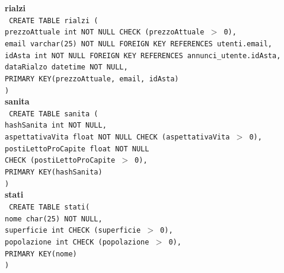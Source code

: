 \documentclass[a4paper,12pt]{report}
\begin{document}
                \newpage
                \noindent
                {\large \textbf{rialzi}} \\
                \texttt{
                    CREATE TABLE rialzi ( \\
                    \null\quad\quad prezzoAttuale   int         NOT NULL CHECK (prezzoAttuale $>$ 0), \\
                    \null\quad\quad email          varchar(25)     NOT NULL FOREIGN KEY REFERENCES utenti.email, \\
                    \null\quad\quad idAsta      int         NOT NULL FOREIGN KEY REFERENCES annunci\_utente.idAsta, \\
                    \null\quad\quad dataRialzo      datetime    NOT NULL, \\
                    \null\quad\quad PRIMARY KEY(prezzoAttuale, email, idAsta) \\
                    )
                } \\

                \noindent
                {\large \textbf{sanita}} \\
                \texttt{
                    CREATE TABLE sanita ( \\
                    \null\quad\quad hashSanita int NOT NULL, \\
                    \null\quad\quad aspettativaVita     float   NOT NULL CHECK (aspettativaVita $>$ 0), \\
                    \null\quad\quad postiLettoProCapite   float   NOT NULL \\
                            \null\qquad\qquad CHECK (postiLettoProCapite $>$ 0), \\
                    \null\quad\quad PRIMARY KEY(hashSanita) \\
                    )
                } \\

                \noindent
                {\large \textbf{stati}} \\
                \texttt{
                    CREATE TABLE stati( \\
                    \null\quad\quad nome            char(25)        NOT NULL, \\
                    \null\quad\quad superficie      int             CHECK (superficie $>$ 0), \\
                    \null\quad\quad popolazione     int             CHECK (popolazione $>$ 0), \\
                    \null\quad\quad PRIMARY KEY(nome) \\
                    )   
                } \\
\end{document}
